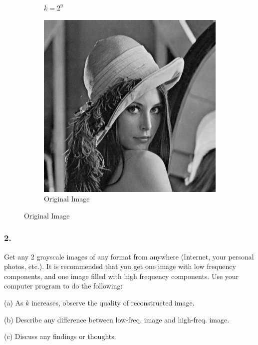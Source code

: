 \begin{figure}[H]
\begin{subfigure}[b]{0.3\textwidth}
        \caption{$k = 2^9$}
    \end{subfigure}
    \hfill
    \begin{subfigure}[b]{0.3\textwidth}
        \centering
        \includegraphics[width=\textwidth]{problem1/image_lena_24bit.bmp}
        \caption{Original Image}
    \end{subfigure}
\end{figure}
\newpage
\subsubsection{2.} Get any 2 grayscale images of any format from anywhere (Internet, your personal photos, etc.). It is recommended that you get one image with low frequency components, and one image filled with high frequency components. Use your computer program to do the following:

(a) As $k$ increases, observe the quality of reconstructed image.

(b) Describe any difference between low-freq. image and high-freq. image.

(c) Discuss any findings or thoughts.

